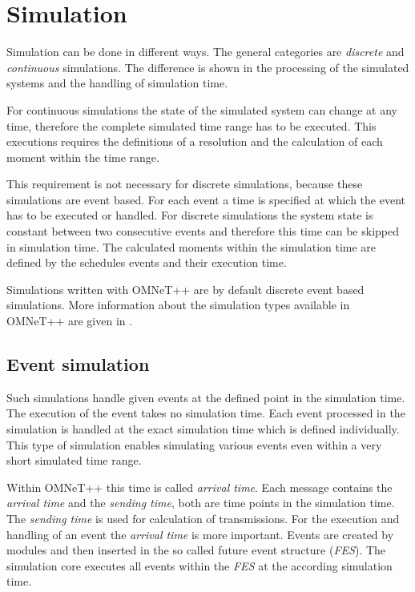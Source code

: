 \chapter{Simulation}
\label{sec:Simulation}
Simulation can be done in different ways. The general categories are \emph{discrete} and \emph{continuous} simulations.
The difference is shown in the processing of the simulated systems and the handling of simulation time.

For continuous simulations the state of the simulated system can change at any time, therefore the complete simulated time range has to be executed.
This executions requires the definitions of a resolution and the calculation of each moment within the time range.

This requirement is not necessary for discrete simulations, because these simulations are event based.
For each event a time is specified at which the event has to be executed or handled.
For discrete simulations the system state is constant between two consecutive events and therefore this time can be skipped in simulation time.
The calculated moments within the simulation time are defined by the schedules events and their execution time.

Simulations written with OMNeT++ are by default discrete event based simulations.
More information about the simulation types available in OMNeT++ are given in \cite[section 4.1]{OMNETMANUAL}.

\section{Event simulation}
\label{sec:EventSimulation}
Such simulations handle given events at the defined point in the simulation time.
The execution of the event takes no simulation time.
Each event processed in the simulation is handled at the exact simulation time which is defined individually.
This type of simulation enables simulating various events even within a very short simulated time range.

Within OMNeT++ this time is called \emph{arrival time}.
Each message contains the \emph{arrival time} and the \emph{sending time}, both are time points in the simulation time.
The \emph{sending time} is used for calculation of transmissions.
For the execution and handling of an event the \emph{arrival time} is more important.
Events are created by modules and then inserted in the so called future event structure (\emph{FES}).
The simulation core executes all events within the \emph{FES} at the according simulation time.

